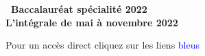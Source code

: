 \documentclass[10pt,a4paper]{article}
\begin{document}
\setlength\parindent{0mm}
\pagestyle{fancy}
\thispagestyle{empty} 
\begin{center}
{\huge\textbf{\decofourleft~Baccalauréat spécialité  
2022~\decofourright\\ \vspace{1cm} L'intégrale de mai à novembre
 2022}}

\vspace{1cm}

Pour un accès direct cliquez sur les liens {\Large 
\textcolor{blue}{bleus}}
\end{center}

\vspace{1cm}

\hypertarget{Sommaire}{}
 
\end{document}
